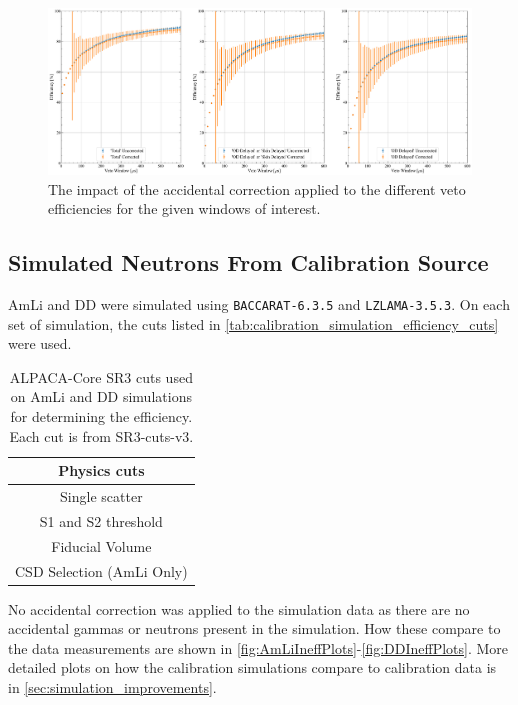 \begin{figure}
	\centering
	\includegraphics[width=\textwidth]{figures/VetoEfficiency/DDAccCorrectionParameters.pdf}
	\caption{The impact of the accidental correction applied to the different veto efficiencies for the given windows of interest.}
	\label{fig:figures/VetoEfficiency/DDAccCorrectionParameters}
\end{figure}



\subsection{Simulated Neutrons From Calibration Source}
AmLi and DD were simulated using \lstinline{BACCARAT-6.3.5} and \lstinline{LZLAMA-3.5.3}.
On each set of simulation, the cuts listed in \autoref{tab:calibration_simulation_efficiency_cuts} were used.
\begin{table}
	\centering
	\begin{tabular}{c}
		Physics cuts              \\
		\hline
		Single scatter            \\
		S1 and S2 threshold       \\
		Fiducial Volume           \\
		CSD Selection (AmLi Only) \\
	\end{tabular}
	\caption{ALPACA-Core SR3 cuts used on AmLi and DD simulations for determining the efficiency. Each cut is from SR3-cuts-v3.}
	\label{tab:calibration_simulation_efficiency_cuts}
\end{table}
No accidental correction was applied to the simulation data as there are no accidental gammas or neutrons present in the simulation.
How these compare to the data measurements are shown in \autoref{fig:AmLiIneffPlots}-\ref{fig:DDIneffPlots}.
More detailed plots on how the calibration simulations compare to calibration data is in \autoref{sec:simulation_improvements}.

